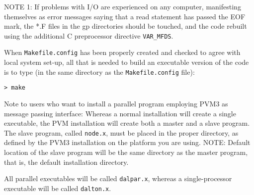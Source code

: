 NOTE 1: If problems with I/O are experienced on
any computer, 
manifesting themselves as error messages saying that a read statement
has passed the EOF mark, the *.F files in the gp directories should be
touched, and the code rebuilt using the additional C preprocessor
directive \verb|VAR_MFDS|.

When  \verb|Makefile.config| has been properly
created and checked 
to agree with local system set-up, all that is needed
to build an executable version of the
code is to type 
(in the same directory as the \verb|Makefile.config| file):
\begin{verbatim}
> make
\end{verbatim}
Note to users who want to install a parallel program employing PVM3
as message passing interface: Whereas a normal installation will
create a single executable, the PVM installation will
create both a master and a slave
program.
The slave program, called \verb|node.x|, must be placed in  the
proper directory, as defined by the PVM3 installation on the
platform you are using. NOTE: Default location of the slave program
will be the same directory as the master program, that is, the default
installation directory.

All parallel executables will be called \verb|dalpar.x|, whereas a
single-processor executable will be called \verb|dalton.x|.

